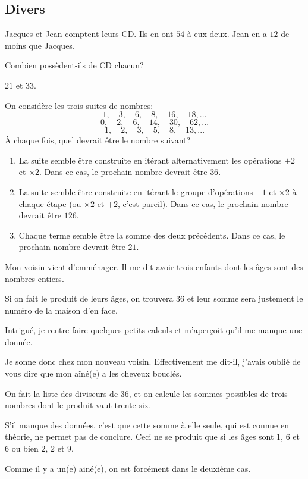\subsection{Divers}

\begin{exo}
Jacques et Jean comptent leurs CD. Ils en ont $54$ à eux deux. Jean en a $12$ de moins que Jacques.

Combien possèdent-ils de CD chacun?
\begin{sol}
$21$ et $33$.
\end{sol}
\end{exo}

\begin{exo}
On considère les trois suites de nombres:
\[1,\quad 3,\quad 6,\quad 8,\quad 16,\quad 18, ...
\]
\[0,\quad 2,\quad 6,\quad 14,\quad 30,\quad 62, ...
\]
\[1,\quad 2,\quad 3,\quad 5,\quad 8,\quad 13, ...
\]
À chaque fois, quel devrait être le nombre suivant?
\begin{sol}
\begin{enumerate}
\item La suite semble être construite en itérant alternativement les opérations $+2$ et $\times 2$. Dans ce cas, le prochain nombre devrait être $36$.
\item La suite semble être construite en itérant le groupe d'opérations $+1$ et $\times 2$ à chaque étape (ou $\times 2$ et $+2$, c'est pareil). Dans ce cas, le prochain nombre devrait être $126$.
\item 
Chaque terme semble être la somme des deux précédents. Dans ce cas, le prochain nombre devrait être $21$.
\end{enumerate}
\end{sol}
\end{exo}

\begin{exo}
Mon voisin vient d'emménager. Il me dit avoir trois enfants dont les âges sont des nombres entiers.

Si on fait le produit de leurs âges, on trouvera $36$ et leur somme sera justement le numéro de la maison d'en face.

Intrigué, je rentre faire quelques petits calculs et m'aperçoit qu'il me manque une donnée.

Je sonne donc chez mon nouveau voisin. Effectivement me dit-il, j'avais oublié de vous dire que mon aîné(e) a les cheveux bouclés.

\begin{sol}
On fait la liste des diviseurs de $36$, et on calcule les sommes possibles de trois nombres dont le produit vaut trente-six.

S'il manque des données, c'est que cette somme à elle seule, qui est connue en théorie, ne permet pas de conclure. Ceci ne se produit que si les âges sont $1$, $6$ et $6$ ou bien $2$, $2$ et $9$.

Comme il y a un(e) ainé(e), on est forcément dans le deuxième cas.
\end{sol}
\end{exo}



